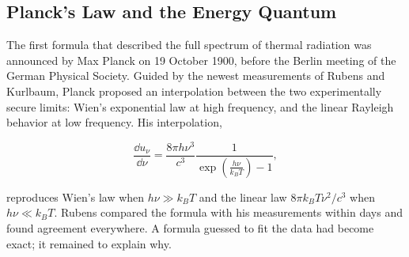 \subsection{Planck's Law and the Energy Quantum}
The first formula that described the full spectrum of thermal radiation was announced by Max Planck on 19 October 1900, before the Berlin meeting of the German Physical Society. Guided by the newest measurements of Rubens and Kurlbaum, Planck proposed an interpolation between the two experimentally secure limits: Wien's exponential law at high frequency, and the linear Rayleigh behavior at low frequency. His interpolation,
\begin{linenomath}\begin{equation}
    \frac{\dd u_\nu}{\dd \nu} = \frac{8\pi h \nu^3}{c^3}\frac{1}{\exp(\frac{h\nu}{k_BT})-1},
\end{equation}\end{linenomath}
reproduces Wien's law when $h\nu\gg k_BT$ and the linear law $8\pi k_BT\nu^2/c^3$ when $h\nu\ll k_BT.$ Rubens compared the formula with his measurements within days and found agreement everywhere. A formula guessed to fit the data had become exact; it remained to explain why.

